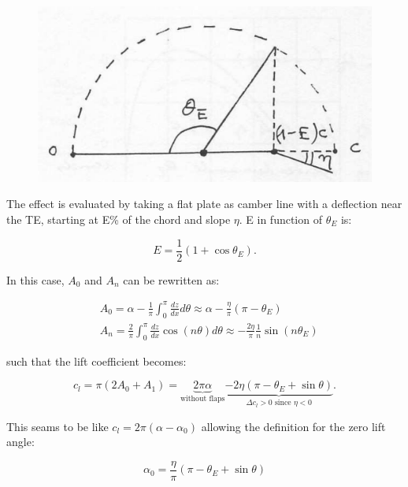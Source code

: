 \documentclass[british,french,11pt, a4paper, openany]{article}
\begin{document}
		\begin{figure}
		\vspace{-5mm}
		\includegraphics[scale=0.1]{ch2/37}
	\end{figure}
	The effect is evaluated by taking a flat plate as camber line with a deflection near the TE, starting at E\% of the chord and slope $\eta$. E in function of $\theta _E$ is: 
	
	\begin{equation}
	E = \frac{1}{2} (1+\cos \theta _E).
	\end{equation}	 
	
	In this case, $A_0$ and $A_n$ can be rewritten as:
	
	\begin{equation}
	\begin{aligned}
	&A_0 = \alpha - \frac{1}{\pi} \int _0 ^\pi \frac{dz}{dx} d\theta \approx \alpha - \frac{\eta}{\pi} (\pi - \theta _E) \\
	&A_n = \frac{2}{\pi} \int _0 ^\pi \frac{dz}{dx} \cos (n\theta )d\theta \approx -\frac{2\eta}{\pi} \frac{1}{n} \sin (n\theta _E)
	\end{aligned}
	\end{equation}
	
	such that the lift coefficient becomes: 
	
	\begin{equation}
	c_l = \pi (2A_0 + A_1) = \underbrace{2\pi \alpha}_{\mbox{without flaps}} \underbrace{- 2\eta (\pi - \theta _E + \sin \theta)}_{\Delta c_l > 0 \mbox{ since } \eta < 0}.
	\end{equation}
	
	This seams to be like $c_l = 2\pi (\alpha - \alpha _0)$ allowing the definition for the zero lift angle: 
	
	\begin{equation}
	\alpha _0 = \frac{\eta}{\pi} (\pi - \theta _E + \sin \theta)
	\end{equation}
	
\end{document}
